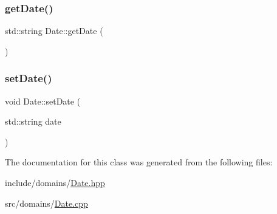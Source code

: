 \subsubsection{\texorpdfstring{getDate()}{getDate()}}
{\footnotesize\ttfamily std\+::string Date\+::get\+Date (\begin{DoxyParamCaption}{ }\end{DoxyParamCaption})}

\mbox{\label{class_date_a5b25692df4700680653cec7185d26124}} 
\subsubsection{\texorpdfstring{setDate()}{setDate()}}
{\footnotesize\ttfamily void Date\+::set\+Date (\begin{DoxyParamCaption}\item[{std\+::string}]{date }\end{DoxyParamCaption})}



The documentation for this class was generated from the following files\+:\begin{DoxyCompactItemize}
\item 
include/domains/\mbox{\hyperlink{_date_8hpp}{Date.\+hpp}}\item 
src/domains/\mbox{\hyperlink{_date_8cpp}{Date.\+cpp}}\end{DoxyCompactItemize}
